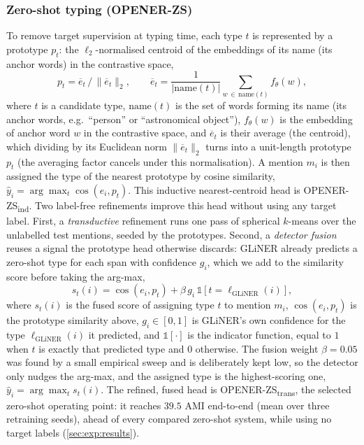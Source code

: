 \documentclass[pdflatex,sn-basic,Numbered]{sn-jnl}
\newcommand{\zstr}{OPENER-ZS\textsubscript{trans}}
\newcommand{\zsind}{OPENER-ZS\textsubscript{ind}}
\begin{document}
\subsubsection{Zero-shot typing (OPENER-ZS)}
To remove target supervision at typing time, each type $t$ is represented by a prototype $p_t$: the $\ell_2$-normalised centroid of the embeddings of its name (its anchor words) in the contrastive space,
\begin{equation}
p_t = \overline{e}_t\,\big/\,\lVert \overline{e}_t\rVert_2,\qquad \overline{e}_t=\frac{1}{|\mathrm{name}(t)|}\!\!\sum_{w\,\in\,\mathrm{name}(t)}\!\!f_\theta(w),
\end{equation}
where $t$ is a candidate type, $\mathrm{name}(t)$ is the set of words forming its name (its anchor words, e.g.\ ``person'' or ``astronomical object''), $f_\theta(w)$ is the embedding of anchor word $w$ in the contrastive space, and $\overline{e}_t$ is their average (the centroid), which dividing by its Euclidean norm $\lVert\overline{e}_t\rVert_2$ turns into a unit-length prototype $p_t$ (the averaging factor cancels under this normalisation). A mention $m_i$ is then assigned the type of the nearest prototype by cosine similarity, $\hat y_i = \arg\max_t \cos(e_i, p_t)$. This inductive nearest-centroid head is \zsind.
Two label-free refinements improve this head without using any target label.
First, a \emph{transductive} refinement runs one pass of spherical $k$-means over the unlabelled test mentions, seeded by the prototypes.
Second, a \emph{detector fusion} reuses a signal the prototype head otherwise discards: GLiNER already predicts a zero-shot type for each span with confidence $g_i$, which we add to the similarity score before taking the arg-max,
\begin{equation}
s_t(i)=\cos(e_i,p_t)+\beta\,g_i\,\mathbb{1}\!\left[t=\ell_{\text{GLiNER}}(i)\right],
\end{equation}
where $s_t(i)$ is the fused score of assigning type $t$ to mention $m_i$, $\cos(e_i,p_t)$ is the prototype similarity above, $g_i\in[0,1]$ is GLiNER's own confidence for the type $\ell_{\text{GLiNER}}(i)$ it predicted, and $\mathbb{1}[\cdot]$ is the indicator function, equal to $1$ when $t$ is exactly that predicted type and $0$ otherwise. The fusion weight $\beta{=}0.05$ was found by a small empirical sweep and is deliberately kept low, so the detector only nudges the arg-max, and the assigned type is the highest-scoring one, $\hat y_i=\arg\max_t s_t(i)$.
The refined, fused head is \zstr, the selected zero-shot operating point: it reaches $39.5$ AMI end-to-end (mean over three retraining seeds), ahead of every compared zero-shot system, while using no target labels (\autoref{sec:exp:results}).
\end{document}
